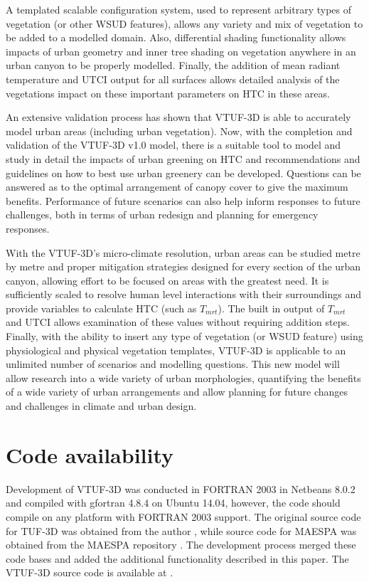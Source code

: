 \documentclass[preprint,12pt,authoryear]{elsarticle}
\begin{document}
A templated scalable configuration system, used to represent arbitrary types of vegetation (or other WSUD features), allows any variety and mix of vegetation to be added to a modelled domain. Also, differential shading functionality allows impacts of urban geometry and inner tree shading on vegetation anywhere in an urban canyon to be properly modelled. Finally, the addition of mean radiant temperature and UTCI output for all surfaces allows detailed analysis of the vegetations impact on these important parameters on HTC in these areas.

An extensive validation process has shown that VTUF-3D is able to accurately model urban areas (including urban vegetation). Now, with the completion and validation of the VTUF-3D v1.0 model, there is a suitable tool to model and study in detail the impacts of urban greening on HTC and recommendations and guidelines on how to best use urban greenery can be developed. Questions can be answered as to the optimal arrangement of canopy cover to give the maximum benefits. Performance of future scenarios can also help inform responses to future challenges, both in terms of urban redesign and planning for emergency responses.

With the VTUF-3D's micro-climate resolution, urban areas can be studied metre by metre and proper mitigation strategies designed for every section of the urban canyon, allowing effort to be focused on areas with the greatest need.  It is sufficiently scaled to resolve human level interactions with their surroundings and provide variables to calculate HTC (such as $T_{mrt}$). The built in output of $T_{mrt}$ and UTCI allows examination of these values without requiring addition steps. Finally, with the ability to insert any type of vegetation (or WSUD feature) using physiological and physical vegetation templates, VTUF-3D is applicable to an unlimited number of scenarios and modelling questions. This new model will allow research into a wide variety of urban morphologies, quantifying the benefits of a wide variety of urban arrangements and allow planning for future changes and challenges in climate and urban design.



\section{Code availability}\label{sec:available}

Development of VTUF-3D was conducted in FORTRAN 2003 \citep{GNU2016a} in Netbeans 8.0.2 \citep{Netbeans2016} and compiled with gfortran 4.8.4 \citep{GNU2016} on Ubuntu 14.04, however, the code should compile on any platform with FORTRAN 2003 support. The original source code for TUF-3D was obtained from the author \citep{Krayenhoff2007}, while source code for MAESPA was obtained from the MAESPA repository \citep{Duursma2016}. The development process merged these code bases and added the additional functionality described in this paper. The VTUF-3D source code is available at \cite{Nice2016c}.
\end{document}
